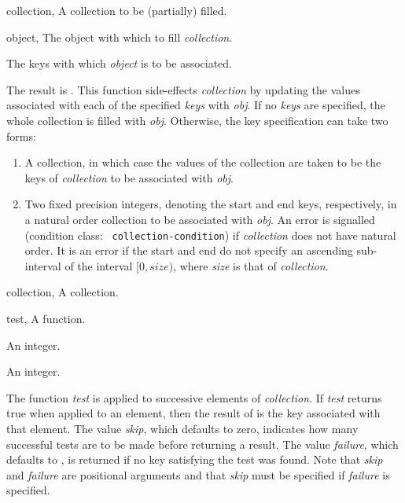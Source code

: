 \begin{optDefinition}
%
\begin{genericargs}
    \item[collection, \classref{collection}] A collection to be (partially) filled.
    \item[object, \classref{object}] The object with which to fill {\em collection}.
    \item[\optional{keys}] The keys with which {\em object\/} is to be
    associated.
\end{genericargs}
%
\result%
The result is \nil{}.
%
\remarks%
This function side-effects {\em collection\/} by updating the values
associated with each of the specified {\em keys\/} with {\em obj}.  If
no {\em keys\/} are specified, the whole collection is filled with
{\em obj}.  Otherwise, the key specification can take two forms:
%
\begin{enumerate}
    \item A collection, in which case the values of the collection are taken to
    be the keys of {\em collection\/} to be associated with {\em obj}.
    \item Two fixed precision integers, denoting the start and end keys,
    respectively, in a natural order collection to be associated with {\em obj}.
    An error is signalled (condition class: {\tt
        collection-condition}) if {\em
        collection\/} does not have natural order.  It is an error if the start
    and end do not specify an ascending sub-interval of the interval $[0,size)$,
    where {\em size\/} is that of {\em collection}.
\end{enumerate}

%
\begin{genericargs}
    \item[collection, \classref{collection}] A collection.
    \item[test, \classref{function}] A function.
    \item[\optional{skip}] An integer.
    \item[\optional{failure}] An integer.
\end{genericargs}
%
\result%
The function {\em test\/} is applied to successive elements of {\em
    collection}. If {\em test\/} returns true when applied to an element, then the
result of  is the key associated with that element.
%
\remarks%
The value {\em skip\/}, which defaults to zero, indicates how many
successful tests are to be made before returning a result. The value {\em
    failure}, which defaults to \nil{}, is returned if no key satisfying the
test was found. Note that {\em skip\/} and {\em failure\/} are positional arguments
and that {\em skip\/} must be specified if {\em failure\/} is specified.


\end{optDefinition}
